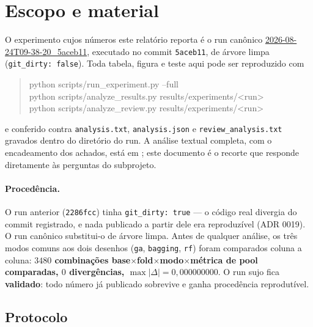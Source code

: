 \section{Escopo e material}

O experimento cujos números este relatório reporta é o run canônico
\url{2026-08-24T09-38-20_5aceb11}, executado no commit \texttt{5aceb11}, de
árvore limpa (\texttt{git\_dirty: false}). Toda tabela, figura e teste aqui pode ser
reproduzido com

\begin{quote}\ttfamily\footnotesize
python scripts/run\_experiment.py --full\\
python scripts/analyze\_results.py results/experiments/<run>\\
python scripts/analyze\_review.py results/experiments/<run>
\end{quote}

\noindent
e conferido contra \texttt{analysis.txt}, \texttt{analysis.json} e
\texttt{review\_analysis.txt} gravados dentro do diretório do run. A análise textual
completa, com o encadeamento dos achados, está em
; este documento é o recorte que responde
diretamente às perguntas do subprojeto.

\paragraph{Procedência.} O run anterior (\texttt{2286fcc}) tinha
\texttt{git\_dirty: true} --- o código real divergia do commit registrado, e nada
publicado a partir dele era reproduzível (ADR 0019). O run canônico substitui-o de
árvore limpa. Antes de qualquer análise, os três modos comuns aos dois desenhos
(\texttt{ga}, \texttt{bagging}, \texttt{rf}) foram comparados coluna a coluna:
\textbf{$3480$ combinações base$\times$fold$\times$modo$\times$métrica de pool
comparadas, $0$ divergências, $\max|\Delta| = 0{,}000000000$}. O run sujo fica
\textbf{validado}: todo número já publicado sobrevive e ganha procedência
reprodutível.

\subsection{Protocolo}


